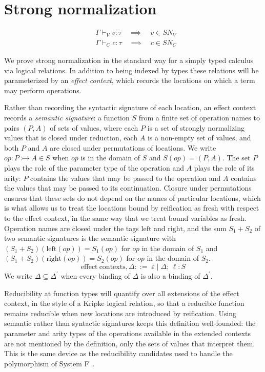 \documentclass[acmsmall, screen, review, anonymous]{acmart}
\theoremstyle{definition}
\newcommand{\loc}{\ell}
\newcommand{\types}{\mathrel{:}}
\newcommand{\cempty}{\varepsilon}
\newcommand{\ccons}[2]{#1;\,#2}
\newcommand{\lbind}[3]{\ccons{#1}{#2\types#3}}
\newcommand{\turnv}{\mathrel{\vdash_V}}
\newcommand{\turnc}{\mathrel{\vdash_C}}
\newcommand{\snv}{SN_V}
\newcommand{\snc}{SN_C}
\begin{document}
\section{Strong normalization}
\label{apdx:strong-normalization}

\begin{align*}
    &\Gamma \turnv v \types \tau
      \quad \implies \quad v \in \snv \\
    &\Gamma \turnc c \types \tau
      \quad \implies \quad c \in \snc
\end{align*}

We prove strong normalization in the standard way for a simply typed
calculus via logical relations. In addition to being indexed by types
these relations will be parameterized by an \emph{effect context},
which records the locations on which a term may perform operations.

Rather than recording the syntactic signature of each location, an
effect context records a \emph{semantic signature}: a function $S$
from a finite set of operation names to pairs $(P, A)$ of sets of
values, where each $P$ is a set of strongly normalizing values that is
closed under reduction, each $A$ is a non-empty set of values, and
both $P$ and $A$ are closed under permutations of locations. We write
$op \types P \rightarrowtail A \in S$ when $op$ is in the domain of $S$
and $S(op) = (P, A)$. The set $P$ plays the role of the parameter type
of the operation and $A$ plays the role of its arity: $P$ contains the
values that may be passed to the operation and $A$ contains the values
that may be passed to its continuation. Closure under permutations
ensures that these sets do not depend on the names of particular
locations, which is what allows us to treat the locations bound by
reification as fresh with respect to the effect context, in the same
way that we treat bound variables as fresh. Operation names are closed
under the tags $\mathrm{left}$ and $\mathrm{right}$, and the sum
$S_1 + S_2$ of two semantic signatures is the semantic signature with
$(S_1 + S_2)(\mathrm{left}(op)) = S_1(op)$ for $op$ in the domain of
$S_1$ and $(S_1 + S_2)(\mathrm{right}(op)) = S_2(op)$ for $op$ in the
domain of $S_2$.
\begin{equation*}
  \mathrm{effect\ contexts}, \Delta ::=\; \cempty \mid \lbind{\Delta}{\loc}{S}
\end{equation*}
We write $\Delta \subseteq \Delta^{\prime}$ when every binding of
$\Delta$ is also a binding of $\Delta^{\prime}$.

Reducibility at function types will quantify over all extensions of
the effect context, in the style of a Kripke logical relation, so that
a reducible function remains reducible when new locations are
introduced by reification. Using semantic rather than syntactic
signatures keeps this definition well-founded: the parameter and arity
types of the operations available in the extended contexts are not
mentioned by the definition, only the sets of values that interpret
them. This is the same device as the reducibility candidates used to
handle the polymorphism of System F~\cite{girard1989proofs}.
\end{document}
